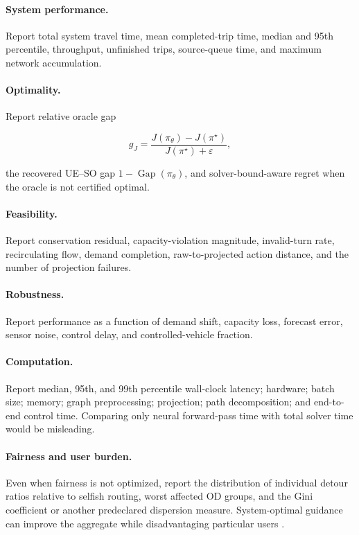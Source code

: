 \documentclass[11pt]{article}
\newcommand{\gap}{\operatorname{Gap}}
\begin{document}
\paragraph{System performance.}
Report total system travel time, mean completed-trip time, median and 95th percentile,
throughput, unfinished trips, source-queue time, and maximum network accumulation.

\paragraph{Optimality.}
Report relative oracle gap

\begin{equation}
  g_J = \frac{J(\pi_\theta)-J(\pi^\star)}
              {J(\pi^\star)+\varepsilon},
\end{equation}

the recovered UE--SO gap \(1-\gap(\pi_\theta)\), and solver-bound-aware regret when the
oracle is not certified optimal.

\paragraph{Feasibility.}
Report conservation residual, capacity-violation magnitude, invalid-turn rate,
recirculating flow, demand completion, raw-to-projected action distance, and the number
of projection failures.

\paragraph{Robustness.}
Report performance as a function of demand shift, capacity loss, forecast error,
sensor noise, control delay, and controlled-vehicle fraction.

\paragraph{Computation.}
Report median, 95th, and 99th percentile wall-clock latency; hardware; batch size;
memory; graph preprocessing; projection; path decomposition; and end-to-end control
time.  Comparing only neural forward-pass time with total solver time would be
misleading.

\paragraph{Fairness and user burden.}
Even when fairness is not optimized, report the distribution of individual detour
ratios relative to selfish routing, worst affected OD groups, and the Gini coefficient
or another predeclared dispersion measure.  System-optimal guidance can improve the
aggregate while disadvantaging particular users \citep{jahn2005}.
\end{document}

